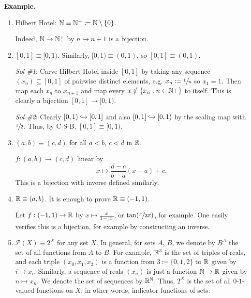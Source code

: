 \documentclass[14pt,oneside]{extarticle}
\newenvironment{example}{
    \par
    \vspace{5pt}
    \noindent\textbf{Example.}
    \begin{tcolorbox}[
        blanker, breakable, left=5mm, parbox=false,
        before upper={\parindent15pt},
        after skip=10pt,
        borderline west={1mm}{0pt}{solarized-magenta!50}]
}{
    \end{tcolorbox}
    \vspace{5pt}
}
\begin{document}
\begin{example}
  \begin{enumerate}[label=$\circ$, leftmargin=*, itemsep=1em]
    \item Hilbert Hotel: $\mathbb{N} \equiv \mathbb{N}^+ \coloneqq \mathbb{N}\setminus \{0\}$.
  

    \indent\soln Indeed, $\mathbb{N} \to \mathbb{N}^+$ by $n \mapsto n+1$ is a bijection.
    \item $[0,1] \equiv [0,1)$. Similarly, $[0,1) \equiv (0,1)$, so $[0,1] \equiv (0,1)$.
    

    \indent\textcolor{solarized-magenta}{\textit{Sol \#1}: } Carve Hilbert Hotel inside $[0,1]$ by taking any sequence $(x_n) \subseteq [0,1]$ of pairwise distinct elements, e.g. $x_n \coloneqq \sfrac 1 n$ so $x_1 = 1$. Then map each $x_n$ to $x_{n+1}$ and map every $x \notin \{x_n: n \in \mathbb{N}+\}$ to itself. This is clearly a bijection $[0,1] \to [0,1)$.
    

    \indent\textcolor{solarized-magenta}{\textit{Sol \#2}: } Clearly $[0,1) \xhookrightarrow{} [0,1]$ and also $[0,1] \xhookrightarrow{} [0,1)$ by the scaling map with $\sfrac 1 2$. Thus, by C-S-B, $[0,1] \equiv [0,1)$.

    \item $(a,b) \equiv (c,d)$ for all $a < b$, $c < d$ in $\mathbb{R}$.
    
    \indent\soln $f: (a,b) \to (c,d)$ linear by 
    \[x \mapsto \frac{d-c}{b-a}(x-a)+c.\]
    This is a bijection with inverse defined similarly.

    \item $\mathbb{R} \equiv (a,b)$. It is enough to prove $\mathbb{R} \equiv (-1,1)$.
    
    \pic
    
    \indent\soln Let $f: (-1,1) \to \mathbb{R}$ by $x \mapsto \frac{x}{1-|x|}$, or $\tan(\sfrac {\pi} {2} x)$, for example. One easily verifies this is a bijection, for example by constructing an inverse.

    \item $\mathscr{P}(X) \equiv 2^X$ for any set $X$.
    In general, for sets $A$, $B$, we denote by $B^A$ the set of all functions from $A$ to $B$. For example, $\mathbb{R}^3$ is the set of triples of reals, and each triple $(x_0,x_1,x_2)$ is a function from $3 \coloneqq \{0,1,2\}$ to $\mathbb{R}$ given by $i \mapsto x_i$. Similarly, a sequence of reals $(x_n)$ is just a function $\mathbb{N} \to \mathbb{R}$ given by $n \mapsto x_n$. We denote the set of sequences by $\mathbb{R}^{\mathbb{N}}$. Thus, $2^X$ is the set of all $0$-$1$-valued functions on $X$, in other words, indicator functions of sets. 


\end{enumerate}
\end{example}
\end{document}
